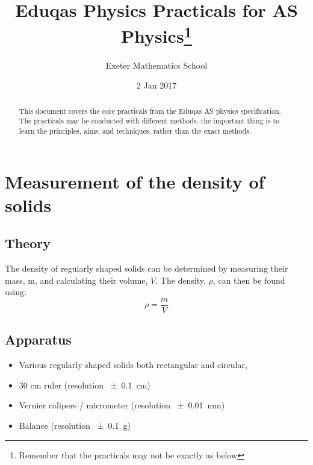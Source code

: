 \documentclass{tufte-handout}
\title{Eduqas Physics Practicals for AS Physics\thanks{Remember that the practicals may not be exactly as below}}
\author[]{Exeter Mathematics School}
\date{2 Jan 2017}  %
\begin{document}
\maketitle%

\begin{abstract}
\noindent This document covers the core practicals from the Eduqas AS physics specification. The practicals may be conducted with different methods, the important thing is to learn the principles, aims, and techniques, rather than the exact methods.
\end{abstract}

\tableofcontents
\newpage
\section{Measurement of the density of solids}
\subsection{Theory}
The density of regularly shaped solids can be determined by measuring their mass, m, and
calculating their volume, $V$. The density, $\rho$, can then be found using:
 \[ \rho = \frac{m}{V}\]


\subsection{Apparatus}
\begin{itemize}

\item Various regularly shaped solids both rectangular and circular,
\item 30 cm ruler (resolution \SI{\pm 0.1}{cm})
\item Vernier calipers / micrometer (resolution \SI{\pm 0.01}{mm})
\item Balance (resolution \SI{\pm 0.1}{g})
\end{itemize}
\end{document}

